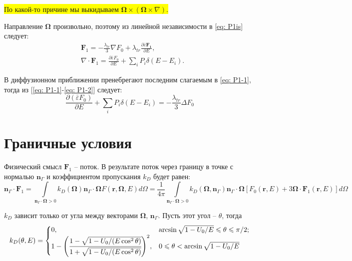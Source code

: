 \documentclass[a4paper,12pt]{article} %
\newcommand{\dff}[2]{\frac{\partial #1}{\partial #2}}
\renewcommand{\vec}[1]{\bm{#1}}
\newcommand{\eps}{\varepsilon}
\begin{document}
\colorbox{yellow}{По какой-то причине мы выкидываем $\vec{\Omega}\times(\vec{\Omega}\times\nabla)$.}

Направление $\vec{\Omega}$ произвольно, поэтому из линейной независимости в \eqref{eq: P1is} следует:
\begin{align}
	& \vec{F}_1 = -\frac{\lambda_{tr}}{3}\nabla F_0 + \lambda_{tr} \dff{\bar{\eps} \vec{F_1}}{E}, \label{eq: P1-1}\\
	& \nabla\cdot\vec{F}_1 = \dff{\bar{\eps}F_0}{E} + \sum_{i} P_i\delta(E - E_i). \label{eq: P1-2}
\end{align} 

В диффузионном приближении пренебрегают последним слагаемым в \eqref{eq: P1-1}, тогда из [\ref{eq: P1-1}-\ref{eq: P1-2}] следует:
\begin{equation}
	\dff{(\bar{\eps}F_0)}{E} + \sum_{i} P_i\delta(E - E_i) = -\frac{\lambda_{tr}}{3}\Delta F_0
\end{equation}

\clearpage

\section{Граничные условия}

Физический смысл $\vec{F}_1$ -- поток. В результате поток через границу в точке с нормалью $\vec{n}_\Gamma$ и коэффициентом пропускания $k_D$ будет равен:
\begin{equation}
	\vec{n}_\Gamma \cdot \vec{F}_1 =
	\int\limits_{\vec{n}_\Gamma \cdot \vec{\Omega}>0} k_D(\vec{\Omega}) \vec{n}_\Gamma \cdot \vec{\Omega} F(\vec{r}, \vec{\Omega}, E) d\Omega = \frac{1}{4\pi} \int\limits_{\vec{n}_\Gamma \cdot \vec{\Omega}>0} k_D(\vec{\Omega}, \vec{n}_\Gamma) \vec{n}_\Gamma \cdot \vec{\Omega} [F_0(\vec{r}, E) + 3\vec{\Omega}\cdot\vec{F}_1(\vec{r}, E)]d\Omega
\end{equation}

$k_D$ зависит только от угла между векторами $\vec{\Omega}$, $\vec{n}_\Gamma$. Пусть этот угол -- $\theta$, тогда
\begin{equation}
	k_D(\theta, E) = 
	\begin{cases}
		0,  & \arcsin\sqrt{1 - U_0/E} \leqslant \theta \leqslant \pi/2; \\
		1 - \Bigg(\cfrac{1 - \sqrt{1 - U_0/(E  \cos^2 \theta)}}{1 + \sqrt{1 - U_0/(E  \cos^2 \theta)}}\Bigg)^2, & 0 \leqslant \theta < \arcsin\sqrt{1 - U_0/E}
	\end{cases}
\end{equation}
\end{document}
